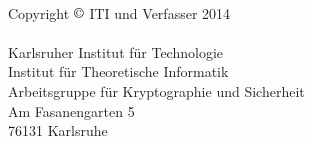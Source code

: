 \thispagestyle{empty}
\ \vfill
\begin{flushleft}
  Copyright $\copyright$ ITI und Verfasser 2014\\
  \ \\
  Karlsruher Institut für Technologie\\
  Institut für Theoretische Informatik\\
  Arbeitsgruppe für Kryptographie und Sicherheit\\
  Am Fasanengarten 5\\
  76131 Karlsruhe
\end{flushleft}
\newpage
